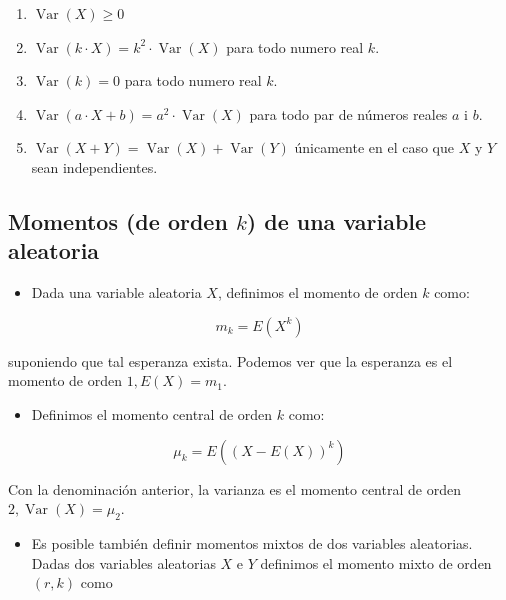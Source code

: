 \documentclass[
]{article}
\providecommand{\tightlist}{%
  \setlength{\itemsep}{0pt}\setlength{\parskip}{0pt}}
\begin{document}
\begin{enumerate}
\def\labelenumi{\arabic{enumi}.}
\tightlist
\item
  \(\operatorname{Var}(X) \geq 0\)
\item
  \(\operatorname{Var}(k \cdot X)=k^{2} \cdot \operatorname{Var}(X)\)
  para todo numero real \(k\).
\item
  \(\operatorname{Var}(k)=0\) para todo numero real \(k\).
\item
  \(\operatorname{Var}(a \cdot X+b)=a^{2} \cdot \operatorname{Var}(X)\)
  para todo par de números reales \(a\) i \(b\).
\item
  \(\operatorname{Var}(X+Y)=\operatorname{Var}(X)+\operatorname{Var}(Y)\)
  únicamente en el caso que \(X\) y \(Y\) sean independientes.
\end{enumerate}

\subsection{\texorpdfstring{Momentos (de orden \(k\)) de una variable aleatoria}{Momentos (de orden k) de una variable aleatoria}}\label{momentos-de-orden-k-de-una-variable-aleatoria}

\begin{itemize}
\tightlist
\item
  Dada una variable aleatoria \(X\), definimos el momento de orden \(k\)
  como:
\end{itemize}

\[
m_{k}=E\left(X^{k}\right)
\]

suponiendo que tal esperanza exista. Podemos ver que la esperanza es el
momento de orden \(1, E(X)=m_{1}\).

\begin{itemize}
\tightlist
\item
  Definimos el momento central de orden \(k\) como:
\end{itemize}

\[
\mu_{k}=E\left((X-E(X))^{k}\right)
\]

Con la denominación anterior, la varianza es el momento central de orden
\(2, \operatorname{Var}(X)=\mu_{2}\).

\begin{itemize}
\tightlist
\item
  Es posible también definir momentos mixtos de dos variables
  aleatorias. Dadas dos variables aleatorias \(X\) e \(Y\) definimos el
  momento mixto de orden \((r, k)\) como
\end{itemize}
\end{document}
